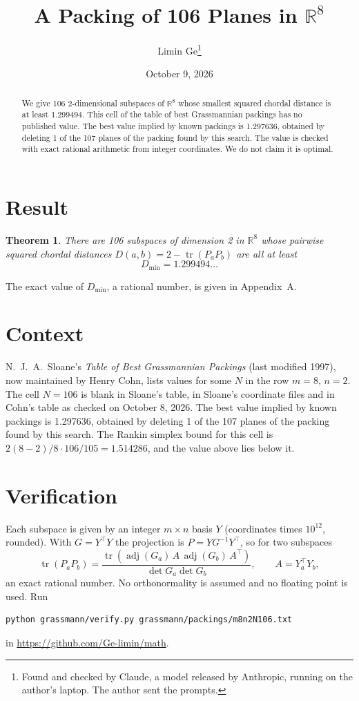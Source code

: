 \documentclass[11pt,a4paper]{article}
\title{A Packing of 106 Planes in $\mathbb{R}^{8}$}
\author{Limin Ge\thanks{Found and checked by Claude, a model released by Anthropic, running on the author's laptop. The author sent the prompts.}}
\date{October 9, 2026}
\newtheorem*{theorem}{Theorem}
\begin{document}
\maketitle
\begin{abstract}
We give 106 2-dimensional subspaces of $\mathbb{R}^{8}$ whose smallest squared chordal distance is at least 1.299494. This cell of the table of best Grassmannian packings has no published value. The best value implied by known packings is 1.297636, obtained by deleting 1 of the 107 planes of the packing found by this search. The value is checked with exact rational arithmetic from integer coordinates. We do not claim it is optimal.
\end{abstract}

\section{Result}
\begin{theorem}
There are 106 subspaces of dimension 2 in $\mathbb{R}^{8}$ whose pairwise squared chordal distances $D(a,b) = 2 - \operatorname{tr}(P_aP_b)$ are all at least
\[ D_{\min} = 1.299494\ldots \]
\end{theorem}
The exact value of $D_{\min}$, a rational number, is given in Appendix~A.


\section{Context}
N.~J.~A.~Sloane's \emph{Table of Best Grassmannian Packings} (last modified 1997), now maintained by Henry Cohn, lists values for some $N$ in the row $m=8$, $n=2$. The cell $N=106$ is blank in Sloane's table, in Sloane's coordinate files and in Cohn's table as checked on October 8, 2026. The best value implied by known packings is 1.297636, obtained by deleting 1 of the 107 planes of the packing found by this search. The Rankin simplex bound for this cell is $2(8-2)/8\cdot 106/105 = 1.514286$, and the value above lies below it.


\section{Verification}
Each subspace is given by an integer $m\times n$ basis $Y$ (coordinates times $10^{12}$, rounded). With $G=Y^\top Y$ the projection is $P=YG^{-1}Y^\top$, so for two subspaces
\[ \operatorname{tr}(P_aP_b)=\frac{\operatorname{tr}(\operatorname{adj}(G_a)\,A\,\operatorname{adj}(G_b)\,A^\top)}{\det G_a\det G_b},\qquad A=Y_a^\top Y_b, \]
an exact rational number. No orthonormality is assumed and no floating point is used. Run
\begin{verbatim}
python grassmann/verify.py grassmann/packings/m8n2N106.txt
\end{verbatim}
in \url{https://github.com/Ge-limin/math}.
\end{document}
